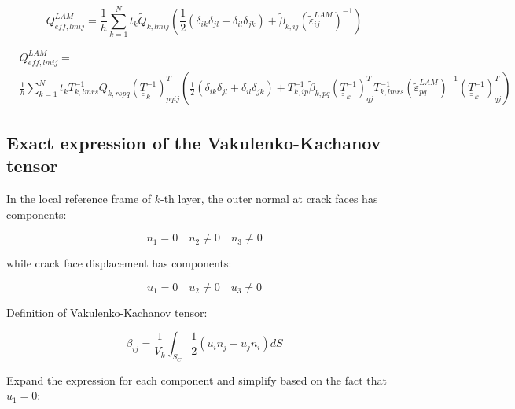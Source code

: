 \documentclass[review]{elsarticle}
\begin{document}
\begin{equation}
Q_{eff,lmij}^{LAM}=\frac{1}{h}\sum_{k=1}^{N}t_{k}\tilde{Q}_{k,lmij}\left(\frac{1}{2}\left(\delta_{ik}\delta_{jl}+\delta_{il}\delta_{jk}\right)+\tilde{\beta}_{k,ij}\left(\tilde{\varepsilon}_{ij}^{LAM}\right)^{-1}\right)
\end{equation}

\begin{equation}
\begin{aligned}
&Q_{eff,lmij}^{LAM}=\\&\frac{1}{h}\sum_{k=1}^{N}t_{k}T_{k,lmrs}^{-1}Q_{k,rspq}\left(\underline{\underline{T}}_{k}^{-1}\right)^{T}_{pqij}\left(\frac{1}{2}\left(\delta_{ik}\delta_{jl}+\delta_{il}\delta_{jk}\right)+T_{k,ip}^{-1}\tilde{\beta}_{k,pq}\left(\underline{\underline{T}}_{k}^{-1}\right)^{T}_{qj}T_{k,lmrs}^{-1}\left(\tilde{\varepsilon}_{pq}^{LAM}\right)^{-1}\left(\underline{\underline{T}}_{k}^{-1}\right)^{T}_{qj}\right)
\end{aligned}
\end{equation}

\subsection{Exact expression of the Vakulenko-Kachanov tensor}

In the local reference frame of $k$-th layer, the outer normal at crack faces has components:

\begin{equation}
n_{1}=0\quad n_{2}\neq0\quad n_{3}\neq0
\end{equation}

while crack face displacement has components:

\begin{equation}
u_{1}=0\quad u_{2}\neq0\quad u_{3}\neq0
\end{equation}

Definition of Vakulenko-Kachanov tensor:

\begin{equation}
\beta_{ij}=\frac{1}{V_{k}}\int_{S_{C}}\frac{1}{2}\left(u_{i}n_{j}+u_{j}n_{i}\right)dS
\end{equation}

Expand the expression for each component and simplify based on the fact that $u_{1}=0$:
\end{document}
